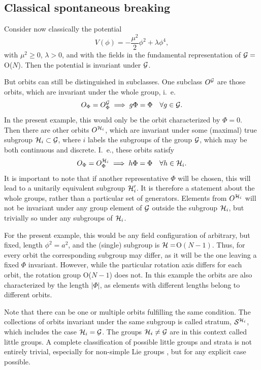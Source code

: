 \documentclass[final,12pt,3p,longtitle]{elsarticle}
\newcommand*{\no}{\noindent}
\newcommand*{\be}{\begin{equation}}
\newcommand*{\ee}{\end{equation}}
\newcommand*{\nn}{\nonumber}
\newcommand*{\1}{1\!\!\!\bot}
\begin{document}
\subsection{Classical spontaneous breaking}\label{ss:cssb}

Consider now classically the potential
\be
V(\phi)=-\frac{\mu^2}{2}\phi^2+\lambda\phi^4\label{esb:pot},
\ee
\no with $\mu^2\ge0$, $\lambda>0$, and with the fields in the fundamental representation of ${\cal G}=$O($N$). Then the potential is invariant under ${\cal G}$.

But orbits can still be distinguished in subclasses. One subclass $O^{\cal G}$ are those orbits, which are invariant under the whole group, i.\ e.\
\be
O_\Phi=O_\Phi^{\cal G}\implies g\Phi=\Phi\quad\forall g\in{\cal G}\nn.
\ee
\no In the present example, this would only be the orbit characterized by $\Phi=0$. Then there are other orbits $O^{{\cal H}_i}$, which are invariant under some (maximal) true subgroup ${\cal H}_i\subset{\cal G}$, where $i$ labels the subgroups of the group ${\cal G}$, which may be both continuous and discrete. I.\ e., these orbits satisfy
\be
O_\Phi=O_\Phi^{{\cal H}_i}\implies h\Phi=\Phi\quad\forall h\in{\cal H}_i\nn.
\ee
\no  It is important to note that if another representative $\Phi$ will be chosen, this will lead to a unitarily equivalent subgroup ${\cal H}_i'$. It is therefore a statement about the whole groups, rather than a particular set of generators. Elements from $O^{{\cal H}_i}$ will not be invariant under any group element of ${\cal G}$ outside the subgroup ${\cal H}_i$, but trivially so under any subgroups of ${\cal H}_i$.

For the present example, this would be any field configuration of arbitrary, but fixed, length $\phi^2=a^2$, and the (single) subgroup is ${\cal H}=$O$(N-1)$. Thus, for every orbit the corresponding subgroup may differ, as it will be the one leaving a fixed $\Phi$ invariant. However, while the particular rotation axis differs for each orbit, the rotation group O($N-1$) does not. In this example the orbits are also characterized by the length $|\Phi|$, as elements with different lengths belong to different orbits.

Note that there can be one or multiple orbits fulfilling the same condition. The collections of orbits invariant under the same subgroup is called stratum, ${\cal S}^{{\cal H}_i}$, which includes the case ${\cal H}_i={\cal G}$. The groups ${\cal H}_i\neq{\cal G}$ are in this context called little groups. A complete classification of possible little groups and strata is not entirely trivial, especially for non-simple Lie groups \cite{O'Raifeartaigh:1978kv}, but for any explicit case possible.
\end{document}
